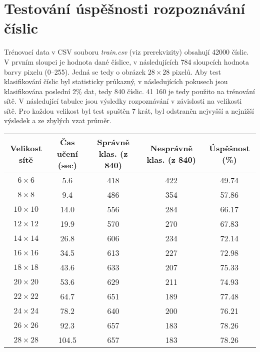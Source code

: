 \documentclass[11pt]{article}
\begin{document}
\section*{Testování úspěšnosti rozpoznávání číslic}

Trénovací data v CSV souboru \textit{train.csv} (viz prerekvizity) obsahují 42000 číslic. V prvním sloupci je hodnota dané číslice, v následujících 784 sloupcích hodnota barvy pixelu (0--255). Jedná se tedy o obrázek $28\times28$ pixelů. Aby test klasifikování číslic byl statisticky průkazný, v následujících pokusech jsou klasifikována poslední 2\% dat, tedy 840 číslic. 41 160 je tedy použito na trénování sítě. V následující tabulce jsou výsledky rozpoznávání v závislosti na velikosti sítě. Pro každou velikost byl test spuštěn 7 krát, byl odstraněn nejvyšší a nejnižší výsledek a ze zbylých vzat průměr.

\begin{center}
	\begin{tabular}{|c c c c c|} 
		\hline
		Velikost sítě & Čas učení (sec) & Správně klas. (z 840) & Nesprávně klas. (z 840) & Úspěšnost (\%) \\ [0.5ex] 
		\hline
		\hline
		$6\times6$ & 5.6 & 418 & 422 & 49.74 \\ 
		\hline
		$8\times8$ & 9.4 & 486 & 354 & 57.86 \\
		\hline
		$10\times10$ & 14.0 & 556 & 284 & 66.17  \\
		\hline
		$12\times12$ & 19.9 & 570 & 270 & 67.83 \\
		\hline
		$14\times14$ & 26.8 & 606 & 234 & 72.14 \\
		\hline
		$16\times16$ & 34.5 & 613 & 227 & 72.98 \\
		\hline
		$18\times18$ & 43.6 & 633 & 207 & 75.33 \\
		\hline
		$20\times20$ & 53.6 & 629 & 211 & 74.93 \\
		\hline
		$22\times22$ & 64.7 & 651 & 189 & 77.48 \\
		\hline
		$24\times24$ & 78.2 & 640 & 200 & 76.21 \\
		\hline
		$26\times26$ & 92.3 & 657 & 183 & 78.26 \\
		\hline
		$28\times28$ & 104.5 & 657 & 183 & 78.26 \\
		\hline
	\end{tabular}
\end{center}
\end{document}
